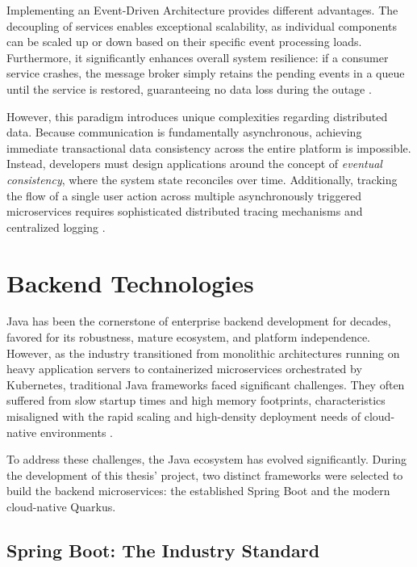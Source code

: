 Implementing an Event-Driven Architecture provides different advantages. The decoupling of services enables exceptional scalability, as individual components can be scaled up or down based on their specific event processing loads. Furthermore, it significantly enhances overall system resilience: if a consumer service crashes, the message broker simply retains the pending events in a queue until the service is restored, guaranteeing no data loss during the outage \cite{microsoft_async_messaging}.

However, this paradigm introduces unique complexities regarding distributed data. Because communication is fundamentally asynchronous, achieving immediate transactional data consistency across the entire platform is impossible. Instead, developers must design applications around the concept of \textit{eventual consistency}, where the system state reconciles over time. Additionally, tracking the flow of a single user action across multiple asynchronously triggered microservices requires sophisticated distributed tracing mechanisms and centralized logging \cite{redhat_eda_essentials}.


\section{Backend Technologies}
\label{sec:backend_technologies}

Java has been the cornerstone of enterprise backend development for decades, favored for its robustness, mature ecosystem, and platform independence. However, as the industry transitioned from monolithic architectures running on heavy application servers to containerized microservices orchestrated by Kubernetes, traditional Java frameworks faced significant challenges. They often suffered from slow startup times and high memory footprints, characteristics misaligned with the rapid scaling and high-density deployment needs of cloud-native environments \cite{redhat_quarkus_kubernetes}.

To address these challenges, the Java ecosystem has evolved significantly. During the development of this thesis' project, two distinct frameworks were selected to build the backend microservices: the established Spring Boot and the modern cloud-native Quarkus.

\subsection{Spring Boot: The Industry Standard}

